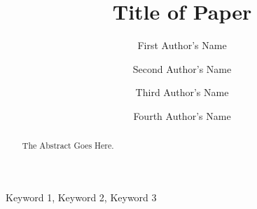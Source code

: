 \begin{frontmatter}


\title{Title of Paper}

\begin{abstract}
    The Abstract Goes Here. \blindtext
\end{abstract}
\begin{keyword}
    Keyword 1\sep
    Keyword 2\sep
    Keyword 3
\end{keyword}

\author[1]{First Author's Name}

\author[1]{Second Author's Name}

\author[2]{Third Author's Name}

\author[3]{Fourth Author's Name}

\address[1]{Department 1, University 1, City 1, Country 1}
\address[2]{Department 2, University 2, City 2, Country 2}
\address[3]{Department 3, University 3, City 3, Country 3}



\end{frontmatter}
